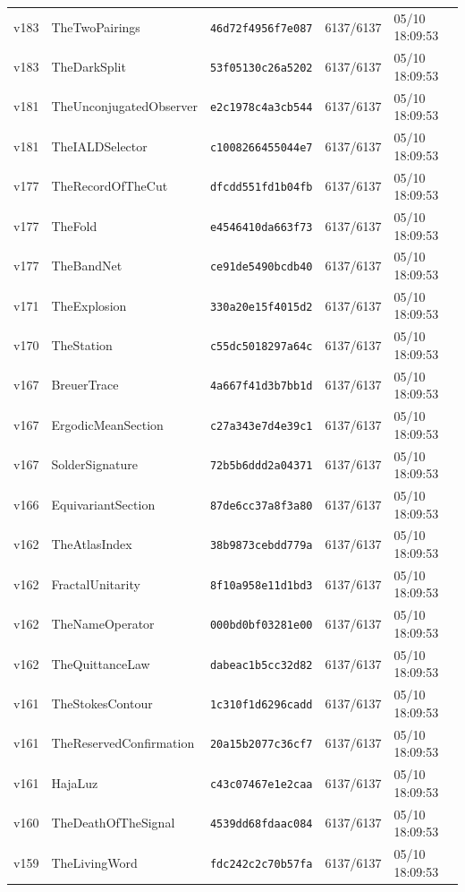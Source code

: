 \documentclass[11pt]{article}
\theoremstyle{definition}\newtheorem{deriv}{Derivação}
\begin{document}
{\begin{longtable}{@{}lllll@{}}
v183 & TheTwoPairings & \texttt{46d72f4956f7e087} & 6137/6137 & 05/10 18:09:53 \\
v183 & TheDarkSplit & \texttt{53f05130c26a5202} & 6137/6137 & 05/10 18:09:53 \\
v181 & TheUnconjugatedObserver & \texttt{e2c1978c4a3cb544} & 6137/6137 & 05/10 18:09:53 \\
v181 & TheIALDSelector & \texttt{c1008266455044e7} & 6137/6137 & 05/10 18:09:53 \\
v177 & TheRecordOfTheCut & \texttt{dfcdd551fd1b04fb} & 6137/6137 & 05/10 18:09:53 \\
v177 & TheFold & \texttt{e4546410da663f73} & 6137/6137 & 05/10 18:09:53 \\
v177 & TheBandNet & \texttt{ce91de5490bcdb40} & 6137/6137 & 05/10 18:09:53 \\
v171 & TheExplosion & \texttt{330a20e15f4015d2} & 6137/6137 & 05/10 18:09:53 \\
v170 & TheStation & \texttt{c55dc5018297a64c} & 6137/6137 & 05/10 18:09:53 \\
v167 & BreuerTrace & \texttt{4a667f41d3b7bb1d} & 6137/6137 & 05/10 18:09:53 \\
v167 & ErgodicMeanSection & \texttt{c27a343e7d4e39c1} & 6137/6137 & 05/10 18:09:53 \\
v167 & SolderSignature & \texttt{72b5b6ddd2a04371} & 6137/6137 & 05/10 18:09:53 \\
v166 & EquivariantSection & \texttt{87de6cc37a8f3a80} & 6137/6137 & 05/10 18:09:53 \\
v162 & TheAtlasIndex & \texttt{38b9873cebdd779a} & 6137/6137 & 05/10 18:09:53 \\
v162 & FractalUnitarity & \texttt{8f10a958e11d1bd3} & 6137/6137 & 05/10 18:09:53 \\
v162 & TheNameOperator & \texttt{000bd0bf03281e00} & 6137/6137 & 05/10 18:09:53 \\
v162 & TheQuittanceLaw & \texttt{dabeac1b5cc32d82} & 6137/6137 & 05/10 18:09:53 \\
v161 & TheStokesContour & \texttt{1c310f1d6296cadd} & 6137/6137 & 05/10 18:09:53 \\
v161 & TheReservedConfirmation & \texttt{20a15b2077c36cf7} & 6137/6137 & 05/10 18:09:53 \\
v161 & HajaLuz & \texttt{c43c07467e1e2caa} & 6137/6137 & 05/10 18:09:53 \\
v160 & TheDeathOfTheSignal & \texttt{4539dd68fdaac084} & 6137/6137 & 05/10 18:09:53 \\
v159 & TheLivingWord & \texttt{fdc242c2c70b57fa} & 6137/6137 & 05/10 18:09:53 \\

\end{longtable}}
\end{document}

